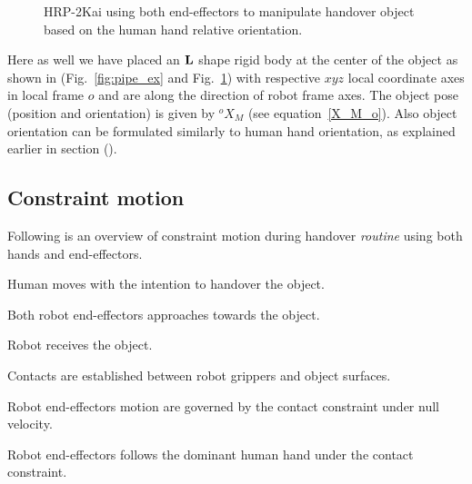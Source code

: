 \begin{figure}[hpt]
	\caption{HRP-2Kai using both end-effectors to manipulate handover object based on the human hand relative orientation.}
	\label{fig:pipe_ori}
\end{figure}


Here as well we have placed an ${\bf L}$ shape rigid body at the center of the object as shown in (Fig.~\ref{fig:pipe_ex} and Fig.~\ref{fig:pipe_ori}) with respective $xyz$ local coordinate axes in local frame $o$ and are along the direction of robot frame axes. The object pose (position and orientation) is given by ${}^{o}{X}_M$ (see equation~\ref{X_M_o}). Also object orientation can be formulated similarly to human hand orientation, as explained earlier in section ().


\subsection{Constraint motion}

Following is an overview of constraint motion during handover \textit{routine} using both hands and end-effectors.
\begin{compactitem}
	\item Human moves with the intention to handover the object.
	\item Both robot end-effectors approaches towards the object.
	\item Robot receives the object.
	\item Contacts are established between robot grippers and object surfaces.
	\item Robot end-effectors motion are governed by the contact constraint under null velocity.
	\item Robot end-effectors follows the dominant human hand under the contact constraint.
\end{compactitem}

